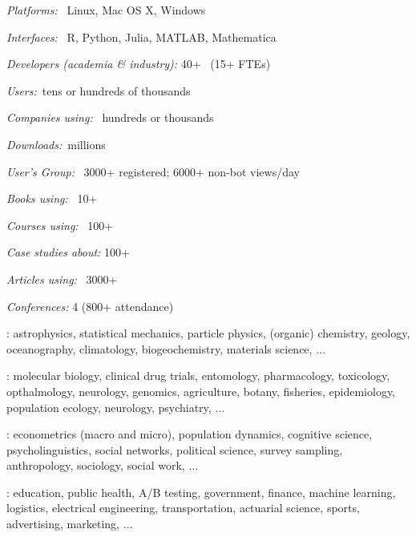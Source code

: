 \documentclass[9pt]{report}
\begin{document}
\begin{subitemize}
\item \textit{Platforms:} \ Linux, Mac OS X, Windows
\vspace*{-4pt}
\item \textit{Interfaces:} \ R, Python, Julia, MATLAB, Mathematica
\vspace*{-4pt}
\item \textit{Developers (academia \& industry):} 40+ \ {\small (15+ FTEs)}
\vspace*{-4pt}
\item \textit{Users:}\ tens or hundreds of thousands
\vspace*{-4pt}
\item \textit{Companies using:} \ hundreds or thousands
\vspace*{-4pt}
\item \textit{Downloads:}\ millions
\vspace*{-4pt}
\item \textit{User's Group:} \ 3000+ registered; 6000+ non-bot views/day
\vspace*{-4pt}
\item \textit{Books using:} \ 10+
\vspace*{-4pt}
\item \textit{Courses using:} \ 100+
\vspace*{-4pt}
\item \textit{Case studies about:} 100+
\vspace*{-4pt}
\item \textit{Articles using:} \ 3000+
\vspace*{-4pt}
\item \textit{Conferences:} 4 (800+ attendance)
\end{subitemize}

%
\begin{subitemize}
\item {}: {\footnotesize
astrophysics, statistical mechanics, particle physics, (organic) chemistry, geology, oceanography, climatology, biogeochemistry, materials science, $\ldots$
}
\vspace*{-3pt}
\item {}: {\footnotesize
molecular biology, clinical drug trials, entomology, pharmacology,
toxicology, opthalmology, neurology, genomics, agriculture, botany, fisheries,
epidemiology, population ecology, neurology, psychiatry, $\ldots$
}
\vspace*{-3pt}
\item {}: {\footnotesize
 econometrics (macro and micro), population dynamics, cognitive
 science, psycholinguistics, social networks, political science,
 survey sampling, anthropology, sociology, social work, $\ldots$
}
\vspace*{-3pt}
\item {}: {\footnotesize education, public health, A/B testing,
government, finance, machine learning, logistics, electrical engineering,  transportation, actuarial science, sports, advertising, marketing, $\ldots$}
\end{subitemize}
\end{document}

